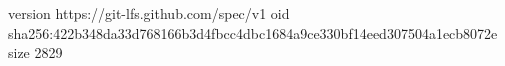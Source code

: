 version https://git-lfs.github.com/spec/v1
oid sha256:422b348da33d768166b3d4fbcc4dbc1684a9ce330bf14eed307504a1ecb8072e
size 2829

